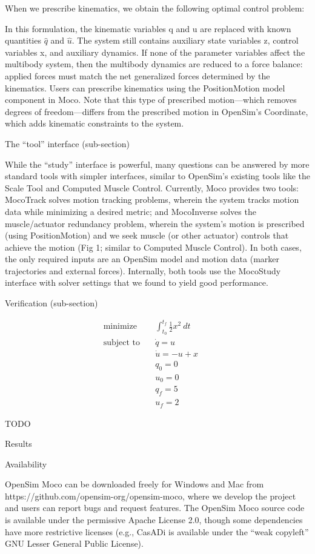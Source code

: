 \documentclass[10pt,letterpaper]{article}
\newcommand{\analytic}{
\begin{equation}
    \begin{alignat*}{2}
        \mbox{minimize}
         \quad & \int_{t_0}^{t_f} \frac{1}{2}x^2~dt &&  \\
         \mbox{subject to}
         \quad & \dot{q} = u \\
         & \dot{u} = -u + x \\
         & q_0 = 0 \\
         & u_0 = 0 \\
         & q_f = 5 \\
         & u_f = 2
    \end{alignat*}
\end{equation}
}
\begin{document}
When we prescribe kinematics, we obtain the following optimal control problem:

In this formulation, the kinematic variables q and u are replaced with known quantities $\hat{q}$ and $\hat{u}$. The system still contains auxiliary state variables z, control variables x, and auxiliary dynamics. If none of the parameter variables affect the multibody system, then the multibody dynamics are reduced to a force balance: applied forces must match the net generalized forces determined by the kinematics. Users can prescribe kinematics using the PositionMotion model component in Moco. Note that this type of prescribed motion—which removes degrees of freedom—differs from the prescribed motion in OpenSim’s Coordinate, which adds kinematic constraints to the system.

The “tool” interface (sub-section)

While the “study” interface is powerful, many questions can be answered by more standard tools with simpler interfaces, similar to OpenSim’s existing tools like the Scale Tool and Computed Muscle Control. Currently, Moco provides two tools: MocoTrack solves motion tracking problems, wherein the system tracks motion data while minimizing a desired metric; and MocoInverse solves the muscle/actuator redundancy problem, wherein the system’s motion is prescribed (using PositionMotion) and we seek muscle (or other actuator) controls that achieve the motion (Fig 1; similar to Computed Muscle Control). In both cases, the only required inputs are an OpenSim model and motion data (marker trajectories and external forces). Internally, both tools use the MocoStudy interface with solver settings that we found to yield good performance.

Verification (sub-section)

\analytic

TODO

Results



Availability

OpenSim Moco can be downloaded freely for Windows and Mac from https://github.com/opensim-org/opensim-moco, where we develop the project and users can report bugs and request features. The OpenSim Moco source code is available under the permissive Apache License 2.0, though some dependencies have more restrictive licenses (e.g., CasADi is available under the “weak copyleft” GNU Lesser General Public License).
\end{document}
